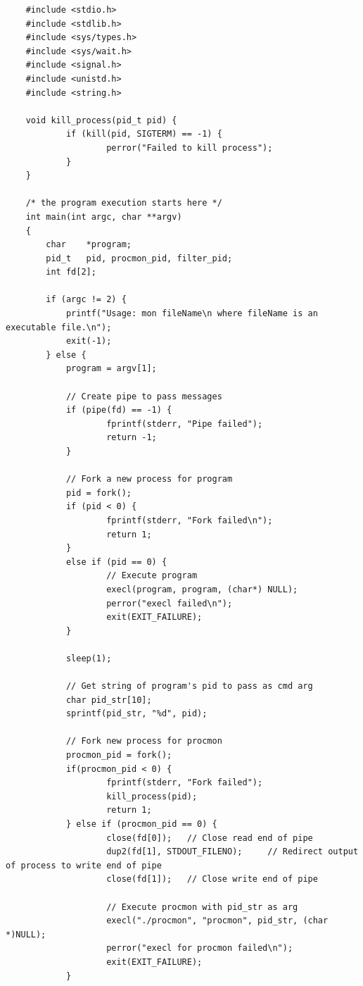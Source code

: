 \documentclass[a4paper,12pt]{article}
\begin{document}
\begin{lstlisting}
    #include <stdio.h>
    #include <stdlib.h>
    #include <sys/types.h>
    #include <sys/wait.h>
    #include <signal.h>
    #include <unistd.h>
    #include <string.h>

    void kill_process(pid_t pid) {
            if (kill(pid, SIGTERM) == -1) {
                    perror("Failed to kill process");
            }
    }

    /* the program execution starts here */
    int main(int argc, char **argv)
    {
        char    *program;
        pid_t   pid, procmon_pid, filter_pid;
        int fd[2];

        if (argc != 2) {
            printf("Usage: mon fileName\n where fileName is an executable file.\n");
            exit(-1);
        } else {
            program = argv[1];

            // Create pipe to pass messages
            if (pipe(fd) == -1) {
                    fprintf(stderr, "Pipe failed");
                    return -1;
            }

            // Fork a new process for program
            pid = fork();
            if (pid < 0) {
                    fprintf(stderr, "Fork failed\n");
                    return 1;
            }
            else if (pid == 0) {
                    // Execute program
                    execl(program, program, (char*) NULL);
                    perror("execl failed\n");
                    exit(EXIT_FAILURE);
            }

            sleep(1);

            // Get string of program's pid to pass as cmd arg
            char pid_str[10];
            sprintf(pid_str, "%d", pid);

            // Fork new process for procmon
            procmon_pid = fork();
            if(procmon_pid < 0) {
                    fprintf(stderr, "Fork failed");
                    kill_process(pid);
                    return 1;
            } else if (procmon_pid == 0) {
                    close(fd[0]);   // Close read end of pipe
                    dup2(fd[1], STDOUT_FILENO);     // Redirect output of process to write end of pipe
                    close(fd[1]);   // Close write end of pipe

                    // Execute procmon with pid_str as arg
                    execl("./procmon", "procmon", pid_str, (char *)NULL);
                    perror("execl for procmon failed\n");
                    exit(EXIT_FAILURE);
            }


\end{lstlisting}
\end{document}
